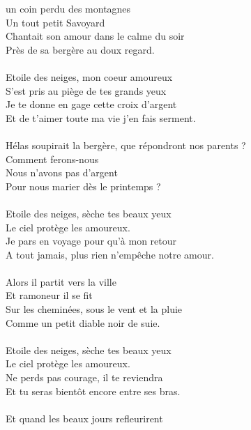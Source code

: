 
 un coin perdu des montagnes
\\Un tout petit Savoyard
\\Chantait son amour dans le calme du soir
\\Près de sa bergère au doux regard.
\\\\Etoile des neiges, mon coeur amoureux
\\S'est pris au piège de tes grands yeux
\\Je te donne en gage cette croix d'argent
\\Et de t'aimer toute ma vie j'en fais serment.
\\\\Hélas soupirait la bergère, que répondront nos parents ?
\\Comment ferons-nous
\\Nous n'avons pas d'argent
\\Pour nous marier dès le printemps ?
\\\\Etoile des neiges, sèche tes beaux yeux
\\Le ciel protège les amoureux.
\\Je pars en voyage pour qu'à mon retour
\\A tout jamais, plus rien n'empêche notre amour.
\\\\Alors il partit vers la ville
\\Et ramoneur il se fit
\\Sur les cheminées, sous le vent et la pluie
\\Comme un petit diable noir de suie.
\\\\Etoile des neiges, sèche tes beaux yeux
\\Le ciel protège les amoureux.
\\Ne perds pas courage, il te reviendra
\\Et tu seras bientôt encore entre ses bras.
\\\\Et quand les beaux jours refleurirent
